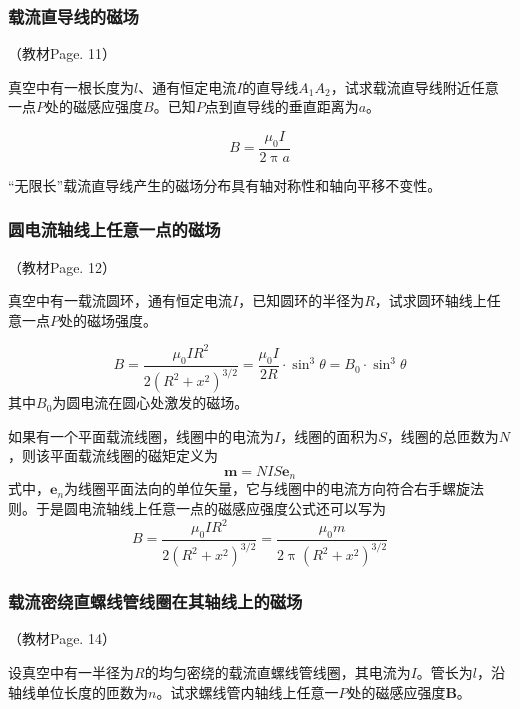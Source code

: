 \documentclass[12pt]{article}
\begin{document}
\subsubsection{载流直导线的磁场}

（教材Page. 11）

真空中有一根长度为\(l\)、通有恒定电流\(I\)的直导线\(A_1A_2\)，试求载流直导线附近任意一点\(P\)处的磁感应强度\(B\)。已知\(P\)点到直导线的垂直距离为\(a\)。

\begin{equation}
    B = \frac{\mu_0 I}{2 \uppi a}
\end{equation}

“无限长”载流直导线产生的磁场分布具有轴对称性和轴向平移不变性。

\subsubsection{圆电流轴线上任意一点的磁场}

（教材Page. 12）

真空中有一载流圆环，通有恒定电流\(I\)，已知圆环的半径为\(R\)，试求圆环轴线上任意一点\(P\)处的磁场强度。

\begin{equation}
    B = \frac{\mu_0 I R^2}{2 \left(R^2 + x^2\right)^{3/2}} = \frac{\mu_0 I}{2R} \cdot \sin^3 \theta = B_0 \cdot \sin^3 \theta
\end{equation}
其中\(B_0\)为圆电流在圆心处激发的磁场。

如果有一个平面载流线圈，线圈中的电流为\(I\)，线圈的面积为\(S\)，线圈的总匝数为\(N\)，则该平面载流线圈的磁矩定义为
\begin{equation}
    \boldsymbol{m} = NIS \boldsymbol{e}_n
\end{equation}
式中，\(\boldsymbol{e}_n\)为线圈平面法向的单位矢量，它与线圈中的电流方向符合右手螺旋法则。于是圆电流轴线上任意一点的磁感应强度公式还可以写为
\begin{equation}
    B = \frac{\mu_0 I R^2}{2 \left(R^2 + x^2\right)^{3/2}} = \frac{\mu_0 m}{2 \uppi \left(R^2 + x^2\right)^{3/2}}
\end{equation}

\subsubsection{载流密绕直螺线管线圈在其轴线上的磁场}

（教材Page. 14）

设真空中有一半径为\(R\)的均匀密绕的载流直螺线管线圈，其电流为\(I\)。管长为\(l\)，沿轴线单位长度的匝数为\(n\)。试求螺线管内轴线上任意一\(P\)处的磁感应强度\(\boldsymbol{B}\)。
\end{document}
